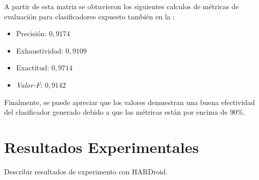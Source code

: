 A partir de esta matriz se obtuvieron los siguientes calculos de métricas
de evaluación para clasificadores expuesto también en la :
\begin{itemize}
\item Precisión: $0,9174$
\item Exhaustividad: $0,9109$
\item Exactitud: $0,9714$
\item \emph{Valor-F}: $0,9142$
\end{itemize}
Finalmente, se puede apreciar que los valores demuestran una buena
efectividad del clasificador generado debido a que las métricas están
por encima de 90\%.

\section{Resultados Experimentales}

\label{sec6:resultados}Describir resultados de experimento con HARDroid.
